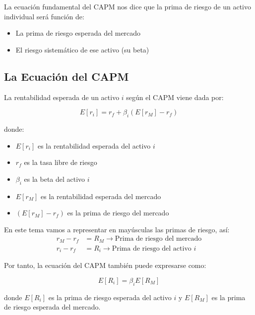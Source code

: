 La ecuación fundamental del CAPM nos dice que la prima de riesgo de un activo individual será función de:
\begin{itemize}
\item La prima de riesgo esperada del mercado
\item El riesgo sistemático de ese activo (su beta)
\end{itemize}

\subsection{La Ecuación del CAPM}

\begin{teorema}
La rentabilidad esperada de un activo $i$ según el CAPM viene dada por:

\begin{equation}
E[r_i] = r_f + \beta_i(E[r_M] - r_f)
\end{equation}

donde:
\begin{itemize}
\item $E[r_i]$ es la rentabilidad esperada del activo $i$
\item $r_f$ es la tasa libre de riesgo
\item $\beta_i$ es la beta del activo $i$
\item $E[r_M]$ es la rentabilidad esperada del mercado
\item $(E[r_M] - r_f)$ es la prima de riesgo del mercado
\end{itemize}
\end{teorema}

En este tema vamos a representar en mayúsculas las primas de riesgo, así:
\begin{align}
r_M - r_f &= R_M \rightarrow \text{Prima de riesgo del mercado} \\
r_i - r_f &= R_i \rightarrow \text{Prima de riesgo del activo } i
\end{align}

Por tanto, la ecuación del CAPM también puede expresarse como:

\begin{equation}
E[R_i] = \beta_i E[R_M]
\end{equation}

donde $E[R_i]$ es la prima de riesgo esperada del activo $i$ y $E[R_M]$ es la prima de riesgo esperada del mercado.

